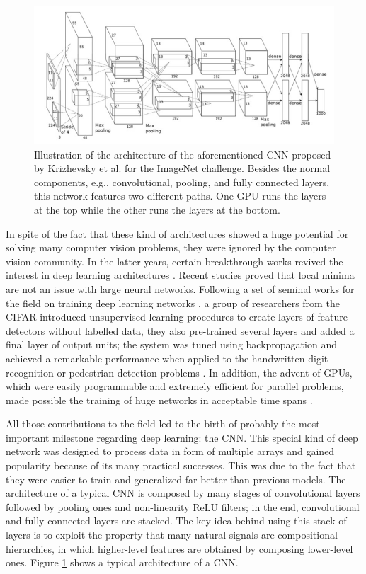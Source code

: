 \begin{figure}[!b]
	\centering
    \includegraphics[width=\linewidth]{Figures/ObjRecog/alexnet}
	\caption{Illustration of the architecture of the aforementioned \ac{CNN} proposed by Krizhevsky et al.\cite{Krizhevsky2012} for the ImageNet challenge. Besides the normal components, e.g., convolutional, pooling, and fully connected layers, this network features two different paths. One \ac{GPU} runs the layers at the top while the other runs the layers at the bottom.}
	\label{fig:convnet_architecture}
\end{figure}

In spite of the fact that these kind of architectures showed a huge potential for solving many computer vision problems, they were ignored by the computer vision community. In the latter years, certain breakthrough works revived the interest in deep learning architectures \cite{Lecun2015}. Recent studies proved that local minima are not an issue with large neural networks. Following a set of seminal works for the field on training deep learning networks \cite{Hinton2006}\cite{Bengio2007}, a group of researchers from the \ac{CIFAR} introduced unsupervised learning procedures to create layers of feature detectors without labelled data, they also pre-trained several layers and added a final layer of output units; the system was tuned using backpropagation and achieved a remarkable performance when applied to the handwritten digit recognition or pedestrian detection problems \cite{Sermanet2013}. In addition, the advent of \acp{GPU}, which were easily programmable and extremely efficient for parallel problems, made possible the training of huge networks in acceptable time spans \cite{Raina2009}.

All those contributions to the field led to the birth of probably the most important milestone regarding deep learning: the \acf{CNN}. This special kind of deep network was designed to process data in form of multiple arrays and gained popularity because of its many practical successes. This was due to the fact that they were easier to train and generalized far better than previous models. The architecture of a typical \ac{CNN} is composed by many stages of convolutional layers followed by pooling ones and non-linearity \ac{ReLU} filters; in the end, convolutional and fully connected layers are stacked. The key idea behind using this stack of layers is to exploit the property that many natural signals are compositional hierarchies, in which higher-level features are obtained by composing lower-level ones. Figure \ref{fig:convnet_architecture} shows a typical architecture of a \ac{CNN}.

